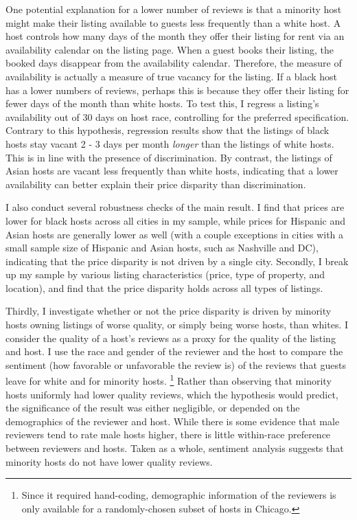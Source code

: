One potential explanation for a lower number of reviews is that a minority host might make their listing available to guests less frequently than a white host. A host controls how many days of the month they offer their listing for rent via an availability calendar on the listing page. When a guest books their listing, the booked days disappear from the availability calendar. Therefore, the measure of availability is actually a measure of true vacancy for the listing. If a black host has a lower numbers of reviews, perhaps this is because they offer their listing for fewer days of the month than white hosts. To test this, I regress a listing's availability out of 30 days on host race, controlling for the preferred specification. Contrary to this hypothesis, regression results show that the listings of black hosts stay vacant 2 - 3 days per month \textit{longer} than the listings of white hosts. This is in line with the presence of discrimination. By contrast, the listings of Asian hosts are vacant less frequently than white hosts, indicating that a lower availability can better explain their price disparity than discrimination. 

I also conduct several robustness checks of the main result. I find that prices are lower for black hosts across all cities in my sample, while prices for Hispanic and Asian hosts are generally lower as well (with a couple exceptions in cities with a small sample size of Hispanic and Asian hosts, such as Nashville and DC), indicating that the price disparity is not driven by a single city. Secondly, I break up my sample by various listing characteristics (price, type of property, and location), and find that the price disparity holds across all types of listings. 

Thirdly, I investigate whether or not the price disparity is driven by minority hosts owning listings of worse quality, or simply being worse hosts, than whites. I consider the quality of a host's reviews as a proxy for the quality of the listing and host. I use the race and gender of the reviewer and the host to compare the sentiment (how favorable or unfavorable the review is) of the reviews that guests leave for white and for minority hosts.%
	\footnote{Since it required hand-coding, demographic information of the reviewers is only available for a randomly-chosen subset of hosts in Chicago.} 
Rather than observing that minority hosts uniformly had lower quality reviews, which the hypothesis would predict, the significance of the result was either negligible, or depended on the demographics of the reviewer and host. While there is some evidence that male reviewers tend to rate male hosts higher, there is little within-race preference between reviewers and hosts. Taken as a whole, sentiment analysis suggests that minority hosts do not have lower quality reviews. 

